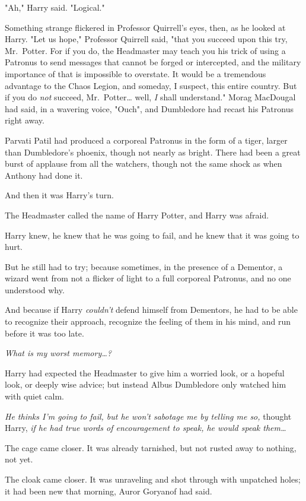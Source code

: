"Ah," Harry said. "Logical."

Something strange flickered in Professor Quirrell's eyes, then, as he looked at 
Harry. "Let us hope," Professor Quirrell said, "that you succeed upon this try, 
Mr.~Potter. For if you do, the Headmaster may teach you his trick of using a 
Patronus to send messages that cannot be forged or intercepted, and the 
military importance of that is impossible to overstate. It would be a 
tremendous advantage to the Chaos Legion, and someday, I suspect, this entire 
country. But if you do \emph{not} succeed, Mr.~Potter{\ldots} well, \emph{I} 
shall understand."
\sbreak
Morag MacDougal had said, in a wavering voice, "Ouch", and Dumbledore had 
recast his Patronus right away.

Parvati Patil had produced a corporeal Patronus in the form of a tiger, larger 
than Dumbledore's phoenix, though not nearly as bright. There had been a great 
burst of applause from all the watchers, though not the same shock as when 
Anthony had done it.

And then it was Harry's turn.

The Headmaster called the name of Harry Potter, and Harry was afraid.

Harry knew, he knew that he was going to fail, and he knew that it was going to 
hurt.

But he still had to try; because sometimes, in the presence of a Dementor, a 
wizard went from not a flicker of light to a full corporeal Patronus, and no 
one understood why.

And because if Harry \emph{couldn't} defend himself from Dementors, he had to 
be able to recognize their approach, recognize the feeling of them in his mind, 
and run before it was too late.

\emph{What is my worst memory{\ldots}?}

Harry had expected the Headmaster to give him a worried look, or a hopeful 
look, or deeply wise advice; but instead Albus Dumbledore only watched him with 
quiet calm.

\emph{He thinks I'm going to fail, but he won't sabotage me by telling me so,} 
thought Harry, \emph{if he had true words of encouragement to speak, he would 
speak them{\ldots}}

The cage came closer. It was already tarnished, but not rusted away to nothing, 
not yet.

The cloak came closer. It was unraveling and shot through with unpatched holes; 
it had been new that morning, Auror Goryanof had said.

